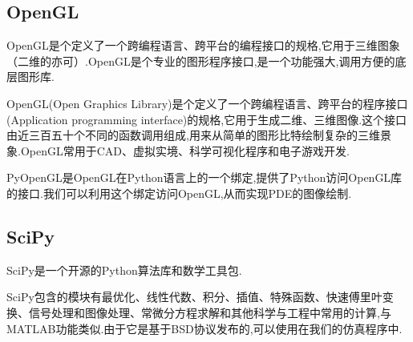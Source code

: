 \subsection{OpenGL}
OpenGL是个定义了一个跨编程语言、跨平台的编程接口的规格,它用于三维图象（二维的亦可）.OpenGL是个专业的图形程序接口,是一个功能强大,调用方便的底层图形库.\par
OpenGL(Open Graphics Library)是个定义了一个跨编程语言、跨平台的程序接口(Application programming interface)的规格,它用于生成二维、三维图像.这个接口由近三百五十个不同的函数调用组成,用来从简单的图形比特绘制复杂的三维景象.OpenGL常用于CAD、虚拟实境、科学可视化程序和电子游戏开发.\par
PyOpenGL是OpenGL在Python语言上的一个绑定,提供了Python访问OpenGL库的接口.我们可以利用这个绑定访问OpenGL,从而实现PDE的图像绘制.
\subsection{SciPy}
SciPy是一个开源的Python算法库和数学工具包.\par
SciPy包含的模块有最优化、线性代数、积分、插值、特殊函数、快速傅里叶变换、信号处理和图像处理、常微分方程求解和其他科学与工程中常用的计算,与MATLAB功能类似.由于它是基于BSD协议发布的,可以使用在我们的仿真程序中.

